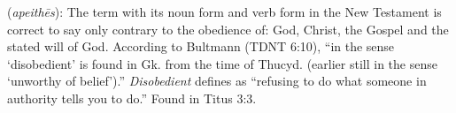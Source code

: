 \item[Disobedient,]

(\textit{apeithēs}):
The term with its noun form  and verb form  in the New Testament is correct to say only contrary to the obedience of: God, Christ, the Gospel and the stated will of God. According to Bultmann (TDNT 6:10), ``in the sense `disobedient' is found in Gk. from the time of Thucyd. (earlier still in the sense `unworthy of belief').''  \emph{Disobedient} defines as ``refusing to do what someone in authority tells you to do.''
Found in Titus 3:3.
